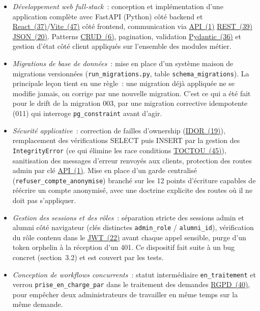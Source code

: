 \documentclass[12pt,a4paper]{report}
\begin{document}
\begin{itemize}
  \item \textit{Développement web full-stack}~: conception et implémentation d'une application complète avec FastAPI (Python) côté backend et \hyperlink{abbr-React}{React~(37)}/\hyperlink{abbr-Vite}{Vite~(47)} côté frontend, communication via \hyperlink{abbr-API}{API~(1)} \hyperlink{abbr-REST}{REST~(39)} \hyperlink{abbr-JSON}{JSON~(20)}. Patterns \hyperlink{abbr-CRUD}{CRUD~(6)}, pagination, validation \hyperlink{abbr-Pydantic}{Pydantic~(36)} et gestion d'état côté client appliqués sur l'ensemble des modules métier.

  \item \textit{Migrations de base de données}~: mise en place d'un système maison de migrations versionnées (\texttt{run\_migrations.py}, table \texttt{schema\_migrations}). La principale leçon tient en une règle~: une migration déjà appliquée ne se modifie jamais, on corrige par une nouvelle migration. C'est ce qui a été fait pour le drift de la migration 003, par une migration corrective idempotente (011) qui interroge \texttt{pg\_constraint} avant d'agir.

  \item \textit{Sécurité applicative}~: correction de failles d'ownership (\hyperlink{abbr-IDOR}{IDOR~(19)}), remplacement des vérifications \og{}SELECT puis INSERT\fg{} par la gestion des \texttt{IntegrityError} (ce qui élimine les race conditions \hyperlink{abbr-TOCTOU}{TOCTOU~(45)}), sanitisation des messages d'erreur renvoyés aux clients, protection des routes admin par clé \hyperlink{abbr-API}{API~(1)}. Mise en place d'un garde centralisé (\texttt{refuser\_compte\_anonymise}) branché sur les 12 points d'écriture capables de réécrire un compte anonymisé, avec une doctrine explicite des routes où il ne doit pas s'appliquer.

  \item \textit{Gestion des sessions et des rôles}~: séparation stricte des sessions admin et alumni côté navigateur (clés distinctes \texttt{admin\_role} / \texttt{alumni\_id}), vérification du rôle contenu dans le \hyperlink{abbr-JWT}{JWT~(22)} avant chaque appel sensible, purge d'un token orphelin à la réception d'un 401. Ce dispositif fait suite à un bug concret (section~3.2) et est couvert par les tests.

  \item \textit{Conception de workflows concurrents}~: statut intermédiaire \texttt{en\_traitement} et verrou \texttt{prise\_en\_charge\_par} dans le traitement des demandes \hyperlink{abbr-RGPD}{RGPD~(40)}, pour empêcher deux administrateurs de travailler en même temps sur la même demande.


\end{itemize}
\end{document}
